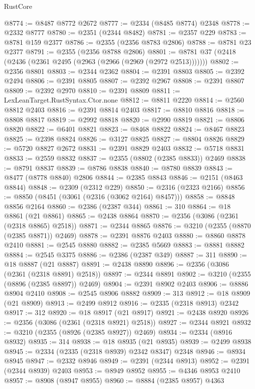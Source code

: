 \begin{lexlean}{RustCore}
\begin{coremodule}
@8774 := @8487 @8772 @2672
@8777 := @2334 (@8485 @8774) @2348
@8778 := @2332 @8777
@8780 := @2351 (@2344 @8482)
@8781 := @2357 @229
@8783 := @8781 @159 @2377
@8786 := @2355 (@2356 @8783 @2806)
@8788 := @8781 @23 @2377
@8791 := @2355 (@2356 @8788 @2806)
@8801 := @8781 @37 (@2418 (@2436 (@2361 @2495 (@2963 (@2966 (@2969 (@2972 @2513)))))))
@8802 := @2356 @8801
@8803 := @2344 @2362
@8804 := @2391 @8803
@8805 := @2392 @2494
@8806 := @2391 @8805
@8807 := @2392 @2967
@8808 := @2391 @8807
@8809 := @2392 @2970
@8810 := @2391 @8809
@8811 := LexLeanTarget.RustSyntax.Ctor.none
@8812 := @8811 @2220
@8814 := @2560 @8812 @2403
@8816 := @2391 @8814 @2403
@8817 := @8810 @8816
@8818 := @8808 @8817
@8819 := @2992 @8818
@8820 := @2990 @8819
@8821 := @8806 @8820
@8822 := @6401 @8821
@8823 := @8468 @8822
@8824 := @8467 @8823
@8825 := @2398 @8824
@8826 := @3127 @8825
@8827 := @8804 @8826
@8829 := @5720 @8827 @2672
@8831 := @2391 @8829 @2403
@8832 := @5718 @8831
@8833 := @2559 @8832
@8837 := @2355 (@8802 (@2385 @8833)) @2469
@8838 := @8791 @8837
@8839 := @8786 @8838
@8840 := @8780 @8839
@8843 := @8477 (@8778 @8840) @2806
@8844 := @2385 @8843
@8846 := @2151 (@8463 @8844)
@8848 := @2309 (@2312 @229)
@8850 := @2316 (@2323 @2166)
@8856 := @8850 (@8451 (@3061 (@2316 (@3062 @2164) @8457)))
@8858 := @8848 @8856 @2164
@8860 := @2386 (@2387 @344)
@8861 := 310
@8864 := @18 @8861 (@21 @8861)
@8865 := @2438 @8864
@8870 := @2356 (@3086 (@2361 (@2318 @8865) @2518))
@8871 := @2344 @8865
@8876 := @3210 (@2355 (@8870 (@2385 @8871)) @2469)
@8878 := @2391 @8876 @2403
@8880 := @8860 @8878 @2410
@8881 := @2545 @8880
@8882 := @2385 @5669
@8883 := @8881 @8882
@8884 := @2545 @3375
@8886 := @2386 (@2387 @349)
@8887 := 311
@8890 := @18 @8887 (@21 @8887)
@8891 := @2438 @8890
@8896 := @2356 (@3086 (@2361 (@2318 @8891) @2518))
@8897 := @2344 @8891
@8902 := @3210 (@2355 (@8896 (@2385 @8897)) @2469)
@8904 := @2391 @8902 @2403
@8906 := @8886 @8904 @2410
@8908 := @2545 @8906 @8882
@8909 := 313
@8912 := @18 @8909 (@21 @8909)
@8913 := @2499 @8912
@8916 := @2335 (@2318 @8913) @2342
@8917 := 312
@8920 := @18 @8917 (@21 @8917)
@8921 := @2438 @8920
@8926 := @2356 (@3086 (@2361 (@2318 @8921) @2518))
@8927 := @2344 @8921
@8932 := @3210 (@2355 (@8926 (@2385 @8927)) @2469)
@8934 := @2334 (@8916 @8932)
@8935 := 314
@8938 := @18 @8935 (@21 @8935)
@8939 := @2499 @8938
@8945 := @2334 (@2335 (@2318 @8939) @2342 @8347) @2348
@8946 := @8934 @8945
@8947 := @2332 @8946
@8949 := @2391 (@2344 @8913)
@8952 := @2391 (@2344 @8939) @2403
@8953 := @8949 @8952
@8955 := @4346 @8953 @2410
@8957 := @8908 (@8947 @8955)
@8960 := @8884 (@2385 @8957) @4363

\end{coremodule}
\end{lexlean}
